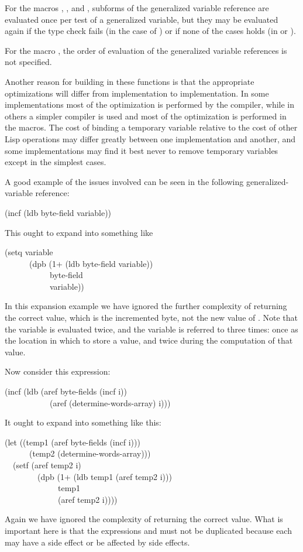 \begin{newer}
For the macros , , and , subforms of the
generalized variable reference are evaluated once per test of a generalized
variable, but they may be
evaluated again if the type check fails (in the case of ) or if none of
the cases holds (in  or ).

For the macro , the order of evaluation of the generalized variable
references is not specified.
\end{newer}

Another reason for building in these functions is that the
appropriate optimizations will differ from implementation to
implementation.  In some implementations most of the optimization is
performed by the compiler, while in others a simpler compiler is used and
most of the optimization is performed in the macros.  The cost of
binding a temporary variable relative to the cost of other Lisp
operations may differ greatly between one implementation
and another, and some implementations may find it
best never to remove temporary variables except in the simplest cases.

A good example of the issues involved can be seen in the following
generalized-variable reference:
\begin{lisp}
(incf (ldb byte-field variable))
\end{lisp}
This ought to expand into something like
\begin{lisp}
(setq variable \\
~~~~~~(dpb (1+ (ldb byte-field variable)) \\
~~~~~~~~~~~byte-field \\
~~~~~~~~~~~variable))
\end{lisp}
In this expansion example we have
ignored the further complexity of returning the correct
value, which is the incremented byte, not the new value of .
Note that the variable  is evaluated twice, and the
variable  is referred to three times:
once as the location in which to store a value,
and twice during the computation of that value.

Now consider this expression:
\begin{lisp}
(incf (ldb (aref byte-fields (incf i)) \\
~~~~~~~~~~~(aref (determine-words-array) i)))
\end{lisp}
It ought to expand into something like this:
\begin{lisp}
(let ((temp1 (aref byte-fields (incf i))) \\
~~~~~~(temp2 (determine-words-array))) \\
~~(setf (aref temp2 i) \\
~~~~~~~~(dpb (1+ (ldb temp1 (aref temp2 i))) \\
~~~~~~~~~~~~~temp1 \\
~~~~~~~~~~~~~(aref temp2 i))))
\end{lisp}
Again we have ignored the complexity of returning the correct value.
What is important here is that the expressions 
and 
must not be duplicated because each may have a side effect or
be affected by side effects.

